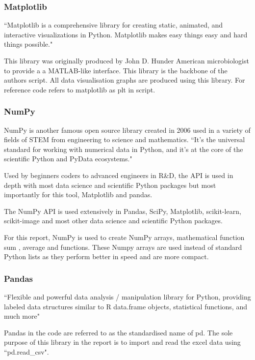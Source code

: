 \subsubsection{Matplotlib}
``Matplotlib is a comprehensive library for creating static, animated, and interactive visualizations in Python. Matplotlib makes easy things easy and hard things possible." \cite{matplotlib}

This library was originally produced by John D. Hunder American microbiologist to provide a a MATLAB-like interface. 
This library is the backbone of the authors script. All data visualisation graphs are produced using this library. For reference code refers to matplotlib as plt in script. 

\subsubsection{NumPy}

NumPy is another famous open source library created in 2006 used in a variety of fields of STEM from engineering to science and mathematics. ``It’s the universal standard for working with numerical data in Python, and it’s at the core of the scientific Python and PyData ecosystems." 

Used by beginners coders to advanced engineers in R\&D, the API is used in depth with most data science and scientific Python packages but most importantly for this tool, Matplotlib and pandas. 

The NumPy API is used extensively in Pandas, SciPy, Matplotlib, scikit-learn, scikit-image and most other data science and scientific Python packages.

For this report, NumPy is used to create NumPy arrays, mathematical function sum \cite{mhvk}, average and functions. These Numpy arrays are used instead of standard Python lists as they perform better in speed and are more compact. 

\subsubsection{Pandas}

``Flexible and powerful data analysis / manipulation library for Python, providing labeled data structures similar to R data.frame objects, statistical functions, and much more" \cite{pandas}

Pandas in the code are referred to as the standardised name of pd. The sole purpose of this library in the report is to import and read the excel data using ``pd.read\_csv".

